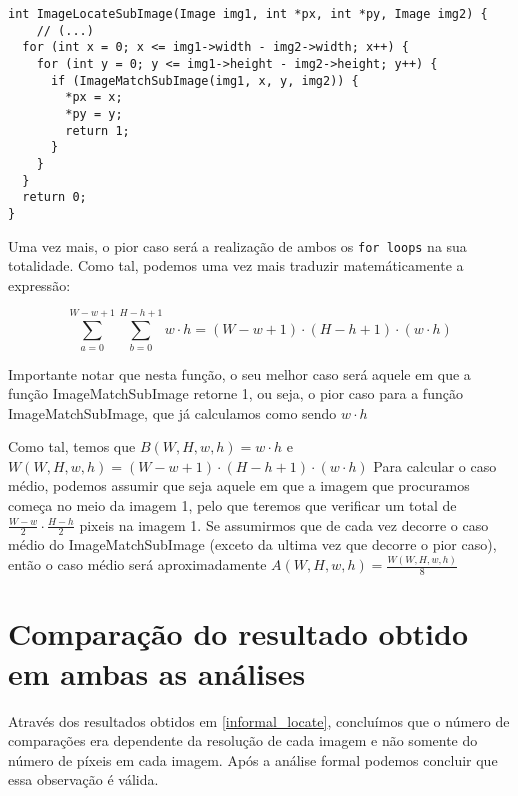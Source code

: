 \begin{listing}[H]
	\centering
	\begin{verbatim}
int ImageLocateSubImage(Image img1, int *px, int *py, Image img2) {
    // (...)
  for (int x = 0; x <= img1->width - img2->width; x++) {
    for (int y = 0; y <= img1->height - img2->height; y++) {
      if (ImageMatchSubImage(img1, x, y, img2)) {
        *px = x;
        *py = y;
        return 1;
      }
    }
  }
  return 0;
}
  \end{verbatim}
\end{listing}

Uma vez mais, o pior caso será a realização de ambos os
\verb|for loops| na sua totalidade. Como tal, podemos
uma vez mais traduzir matemáticamente a expressão:

\begin{equation}
	\sum_{a=0}^{W-w+1}\sum_{b=0}^{H-h+1}w\cdot h = (W-w+1)\cdot(H-h+1)\cdot(w\cdot h)
\end{equation}

Importante notar que nesta função, o seu melhor caso será
aquele em que a função ImageMatchSubImage retorne 1, ou
seja, o pior caso para a função ImageMatchSubImage, que já
calculamos como sendo $w \cdot h$

Como tal, temos que $B(W,H,w,h) = w\cdot h$ e $W(W,H,w,h) = (W-w+1)\cdot(H-h+1)\cdot(w\cdot h)$
Para calcular o caso médio, podemos assumir que seja aquele
em que a imagem que procuramos começa no meio da imagem 1,
pelo que teremos que verificar um total de $\frac{W - w}{2}
	\cdot \frac{H-h}{2}$ pixeis na imagem 1. Se assumirmos que de
cada vez decorre o caso médio do ImageMatchSubImage (exceto
da ultima vez que decorre o pior caso), então o caso médio
será aproximadamente $A(W,H,w,h) = \frac{W(W,H,w,h)}{8}$

\section[Resultados]{Comparação do resultado obtido em ambas as análises}

Através dos resultados obtidos em \ref{informal_locate},
concluímos que o número de comparações era dependente da
resolução de cada imagem e não somente do número de píxeis
em cada imagem. Após a análise formal podemos concluir que
essa observação é válida.
